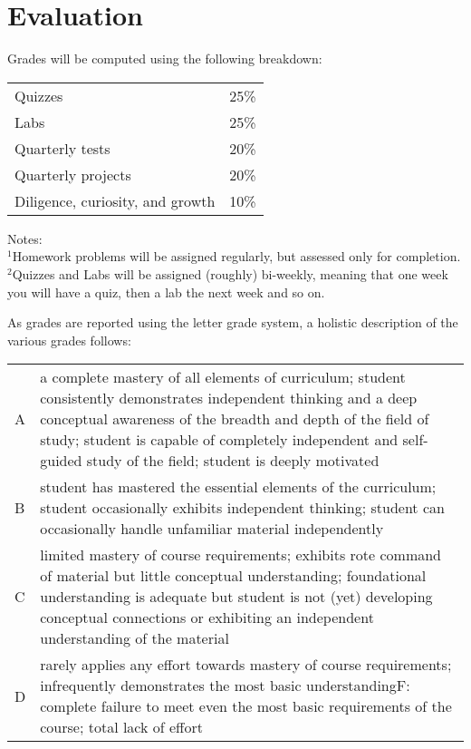 \documentclass{article}
\begin{document}
\section{Evaluation}
Grades will be computed using the following breakdown:
\begin{table}[h]
\begin{tabular}{ll}
\toprule
Quizzes & 25\% \\
Labs & 25\% \\
Quarterly tests & 20\% \\
Quarterly projects & 20\% \\
Diligence, curiosity, and growth & 10\% \\
\bottomrule
\end{tabular}

{\small\noindent Notes:\\
$^1$Homework problems will be assigned regularly, but assessed only for completion.\\
$^2$Quizzes and Labs will be assigned (roughly) bi-weekly, meaning that one week you will have a quiz, then a lab the next week and so on.}
\end{table}

As grades are reported using the letter grade system, a holistic description of the various grades follows:
\begin{table}[h]
\begin{tabular}{lp{4in}}
\toprule
A & a complete mastery of all elements of curriculum; student consistently demonstrates independent thinking and a deep conceptual awareness of the breadth and depth of the field of study; student is capable of completely independent and self-guided study of the field; student is deeply motivated \\
B & student has mastered the essential elements of the curriculum; student occasionally exhibits independent thinking; student can occasionally handle unfamiliar material independently \\
C & limited mastery of course requirements; exhibits rote command of material but little conceptual understanding; foundational understanding is adequate but student is not (yet) developing conceptual connections or exhibiting an independent
understanding of the material \\
D & rarely applies any effort towards mastery of course requirements; infrequently demonstrates the most basic understandingF: complete failure to meet even the most basic requirements of the course; total lack of effort \\
\bottomrule
\end{tabular}
\end{table}
\end{document}
